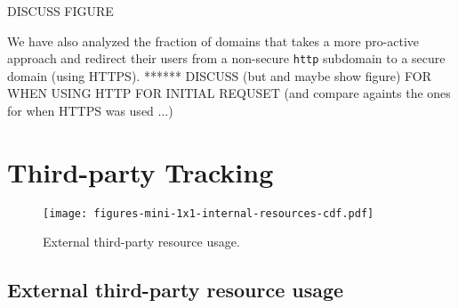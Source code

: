 \documentclass{sig-alternate-10pt}
\begin{document}
DISCUSS FIGURE

We have also analyzed the fraction of domains that takes a 
more pro-active approach and redirect their users from a non-secure \texttt{http} subdomain
to a secure domain (using HTTPS).   
******
DISCUSS (but and maybe show figure) FOR WHEN USING HTTP FOR INITIAL REQUSET
(and compare againts the ones for when HTTPS was used ...)


\section{Third-party Tracking}\label{sec:tracking}


\begin{figure}[t]
\texttt{[image: figures-mini-1x1-internal-resources-cdf.pdf]}
\caption{External third-party resource usage.}
\label{fig:external}
\vspace{-0pt}
\end{figure}

\subsection{External third-party resource usage}
\end{document}
